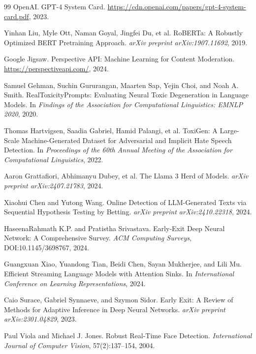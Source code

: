 \documentclass[acmtjournal, acmnowidth]{acmart}
\theoremstyle{definition}
\begin{document}
\begin{thebibliography}{99}
OpenAI.
\newblock GPT-4 System Card.
\newblock \url{https://cdn.openai.com/papers/gpt-4-system-card.pdf}, 2023.

Yinhan Liu, Myle Ott, Naman Goyal, Jingfei Du, et al.
\newblock RoBERTa: A Robustly Optimized BERT Pretraining Approach.
\newblock \emph{arXiv preprint arXiv:1907.11692}, 2019.

Google Jigsaw.
\newblock Perspective API: Machine Learning for Content Moderation.
\newblock \url{https://perspectiveapi.com/}, 2024.


Samuel Gehman, Suchin Gururangan, Maarten Sap, Yejin Choi, and Noah A. Smith.
\newblock RealToxicityPrompts: Evaluating Neural Toxic Degeneration in Language Models.
\newblock In \emph{Findings of the Association for Computational Linguistics: EMNLP 2020}, 2020.



Thomas Hartvigsen, Saadia Gabriel, Hamid Palangi, et al.
\newblock ToxiGen: A Large-Scale Machine-Generated Dataset for Adversarial and Implicit Hate Speech Detection.
\newblock In \emph{Proceedings of the 60th Annual Meeting of the Association for Computational Linguistics}, 2022.

Aaron Grattafiori, Abhimanyu Dubey, et al.
\newblock The Llama 3 Herd of Models.
\newblock \emph{arXiv preprint arXiv:2407.21783}, 2024.


Xiaohui Chen and Yutong Wang.
\newblock Online Detection of LLM-Generated Texts via Sequential Hypothesis Testing by Betting.
\newblock \emph{arXiv preprint arXiv:2410.22318}, 2024.

HaseenaRahmath K.P. and Pratistha Srivastava.
\newblock Early-Exit Deep Neural Network: A Comprehensive Survey.
\newblock \emph{ACM Computing Surveys}, DOI:10.1145/3698767, 2024.

Guangxuan Xiao, Yuandong Tian, Beidi Chen, Sayan Mukherjee, and Lili Mu.
\newblock Efficient Streaming Language Models with Attention Sinks.
\newblock In \emph{International Conference on Learning Representations}, 2024.

Caio Surace, Gabriel Synnaeve, and Szymon Sidor.
\newblock Early Exit: A Review of Methods for Adaptive Inference in Deep Neural Networks.
\newblock \emph{arXiv preprint arXiv:2301.04829}, 2023.

Paul Viola and Michael J. Jones.
\newblock Robust Real-Time Face Detection.
\newblock \emph{International Journal of Computer Vision}, 57(2):137--154, 2004.

\end{thebibliography}
\end{document}
